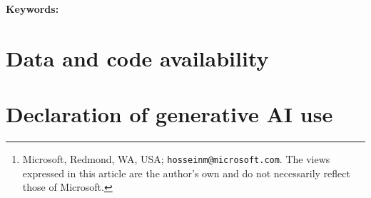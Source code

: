 \documentclass[11pt]{article}
\title{\papertitle}
\author{Hossein Mohasel Arjomandi\thanks{Microsoft, Redmond, WA, USA; \texttt{hosseinm@microsoft.com}. The views expressed in this article are the author's own and do not necessarily reflect those of Microsoft.}}
\date{}
\begin{document}
\maketitle

\begin{abstract}

\end{abstract}

\noindent\textbf{Keywords:} \paperkeywords








\section*{Data and code availability}\label{sec:availability}


\section*{Declaration of generative AI use}




\end{document}
